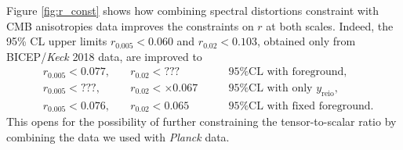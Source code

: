 Figure \ref{fig:r_const} shows how combining spectral distortions constraint with CMB anisotropies data improves the constraints on $r$ at both scales. Indeed, the 95\% CL upper limits $r_{0.005}<0.060$ and $r_{0.02}<0.103$, obtained only from BICEP/\textit{Keck} 2018 data, are improved to 
\begin{align*}
    &r_{0.005}<0.077,\quad &r_{0.02}<???\qquad&\text{95\%CL with foreground,}\\
    &r_{0.005}<???,\quad &r_{0.02}<\times0.067\qquad&\text{95\%CL with only $y_{\text{reio}}$,}\\
    &r_{0.005}<0.076,\quad &r_{0.02}<0.065\qquad&\text{95\%CL with fixed foreground}.
\end{align*}
This opens for the possibility of further constraining the tensor-to-scalar ratio by combining the data we used with \textit{Planck} \cite{planck2018results} data. 
